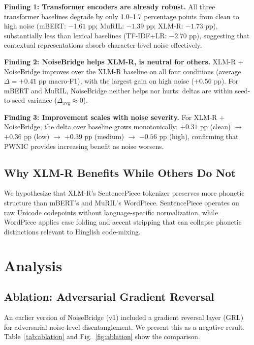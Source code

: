 \documentclass[conference]{IEEEtran}
\begin{document}
\textbf{Finding 1: Transformer encoders are already robust.} All three transformer baselines degrade by only 1.0--1.7 percentage points from clean to high noise (mBERT: $-1.61$ pp; MuRIL: $-1.39$ pp; XLM-R: $-1.73$ pp), substantially less than lexical baselines (TF-IDF+LR: $-2.70$ pp), suggesting that contextual representations absorb character-level noise effectively.

\textbf{Finding 2: NoiseBridge helps XLM-R, is neutral for others.} XLM-R + NoiseBridge improves over the XLM-R baseline on all four conditions (average $\Delta = +0.41$ pp macro-F1), with the largest gain on high noise ($+0.56$ pp). For mBERT and MuRIL, NoiseBridge neither helps nor hurts: deltas are within seed-to-seed variance ($\Delta_\text{avg} \approx 0$).

\textbf{Finding 3: Improvement scales with noise severity.} For XLM-R + NoiseBridge, the delta over baseline grows monotonically: $+0.31$ pp (clean) $\to$ $+0.36$ pp (low) $\to$ $+0.39$ pp (medium) $\to$ $+0.56$ pp (high), confirming that PWNIC provides increasing benefit as noise worsens.

\subsection{Why XLM-R Benefits While Others Do Not}

We hypothesize that XLM-R's SentencePiece tokenizer preserves more phonetic structure than mBERT's and MuRIL's WordPiece. SentencePiece operates on raw Unicode codepoints without language-specific normalization, while WordPiece applies case folding and accent stripping that can collapse phonetic distinctions relevant to Hinglish code-mixing.


\section{Analysis}
\label{sec:analysis}

\subsection{Ablation: Adversarial Gradient Reversal}
\label{sec:ablation}

An earlier version of NoiseBridge (v1) included a gradient reversal layer (GRL)~\cite{ganin2016domain} for adversarial noise-level disentanglement. We present this as a negative result. Table~\ref{tab:ablation} and Fig.~\ref{fig:ablation} show the comparison.
\end{document}
